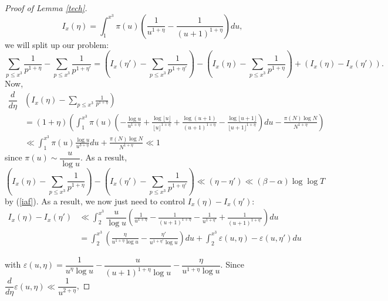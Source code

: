 \documentclass[10pt,a4paper]{amsart}
\newcommand{\eps}{\varepsilon}
\renewcommand{\leq}{\leqslant}
\begin{document}
\begin{proof}[Proof of Lemma \ref{tech}]
\begin{equation}
    I_x(\eta) = \int_1^{x^3} \pi(u)(\frac{1}{u^{1+\eta}} - \frac{1}{(u+1)^{1 + \eta}})du,
\end{equation}
we will split up our problem:
\begin{equation}
    \sum_{p \leq x^3} \frac{1}{p^{1 + \eta}} - \sum_{p \leq x^3} \frac{1}{p^{1 + \eta'}} = \left(I_x(\eta')  - \sum_{p \leq x^3} \frac{1}{p^{1 + \eta'}} \right) - \left(I_x(\eta)  - \sum_{p \leq x^3} \frac{1}{p^{1 + \eta}} \right) + (I_x(\eta) - I_x(\eta')).
\end{equation}
Now,
\begin{equation}
    \begin{split}
        \dfrac{d}{d\eta} & \left(I_x(\eta)  - \sum_{p \leq x^3} \frac{1}{p^{1 + \eta}} \right) \\
        & = (1 + \eta) \left( \int_{1}^{x^3}\pi(u) (-\frac{\log u}{u^{1 + \eta}} + \frac{\log \lfloor u \rfloor}{\lfloor u\rfloor^{1 + \eta}} + \frac{\log (u+1)}{(u+1)^{1+\eta}} - \frac{\log \lfloor u+1 \rfloor}{\lfloor u+1\rfloor ^{1+\eta}}) du - \frac{\pi(N) \log N}{N^{1 + \eta}} \right) \\
        & \ll \int_{1}^{x^3}\pi(u) \frac{\log u}{u^{3+\eta}}du + \frac{\pi(N)\log N}{N^{1+\eta}} \ll 1
    \end{split}
\end{equation}
since $\pi(u) \sim \dfrac{u}{\log u}$. As a result,
\begin{equation}
    \left(I_x(\eta)  - \sum_{p \leq x^3} \frac{1}{p^{1 + \eta}} \right) - \left(I_x(\eta')  - \sum_{p \leq x^3} \frac{1}{p^{1 + \eta'}} \right) \ll (\eta - \eta') \ll (\beta - \alpha) \log \log T
\end{equation}
by (\ref{iaf}). As a result, we now just need to control $I_x(\eta) - I_x(\eta')$:
\begin{equation}
\begin{split}
    I_x(\eta) - I_x(\eta') & \ll \int_{2}^{x^3} \dfrac{u}{\log u}\left(\frac{1}{u^{1 + \eta}} - \frac{1}{(u+1)^{1 + \eta}} - \frac{1}{u^{1 + \eta'}} + \frac{1}{(u+1)^{1 + \eta'}} \right) du \\
    & = \int_2^{x^3} \left(\frac{\eta}{u^{1 + \eta} \log u} - \frac{\eta'}{u^{1 + \eta'}\log u} \right) du + \int_2^{x^3} \eps(u, \eta) - \eps(u, \eta')du
\end{split}
\end{equation}

with $\eps(u, \eta) = \dfrac{1}{u^{\eta} \log u} - \dfrac{u}{(u+1)^{1 + \eta} \log u} - \dfrac{\eta}{u^{1 + \eta} \log u}$. Since $\dfrac{d}{d \eta} \eps(u, \eta) \ll \dfrac{1}{u^{2 + \eta}}$,


\end{proof}
\end{document}
